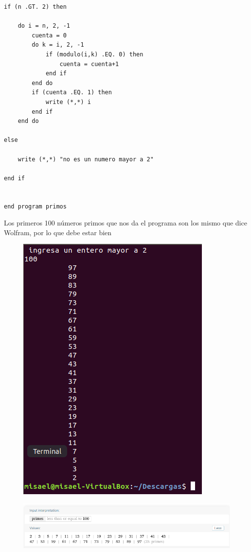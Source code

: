 \documentclass[12pt,a4paper]{article}
\begin{document}
\begin{enumerate}
\begin{verbatim}
if (n .GT. 2) then 
	
	do i = n, 2, -1
		cuenta = 0
		do k = i, 2, -1
			if (modulo(i,k) .EQ. 0) then
				cuenta = cuenta+1
			end if
		end do
		if (cuenta .EQ. 1) then
			write (*,*) i
		end if
	end do
	
else 

	write (*,*) "no es un numero mayor a 2"

end if


end program primos
    \end{verbatim}
    
    Los primeros 100 números primos que nos da el programa son los mismo que dice Wolfram, por lo que debe estar bien
    
    \begin{figure}[h!]
        \centering
        \includegraphics[scale = 0.7]{3.1.PNG}
    \end{figure}
    
    \begin{figure}[h!]
        \centering
        \includegraphics[scale = 0.7]{3.2.PNG}
    \end{figure}
    

\end{enumerate}
\end{document}
